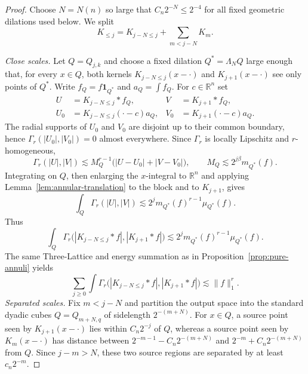 \documentclass[10pt,a4paper]{amsart}
\numberwithin{equation}{section}
\newcommand{\R}{\mathbb R}
\newcommand{\norm}[1]{\lVert #1\rVert}
\begin{document}
\begin{proof}
Choose $N=N(n)$ so large that $C_n2^{-N}\le2^{-4}$ for all fixed geometric
dilations used below.  We split
\[
 K_{\le j}=K_{j-N\le j}+\sum_{m<j-N}K_m.
\]

\emph{Close scales.}
Let $Q=Q_{j,k}$ and choose a fixed dilation $Q^*=\Lambda_NQ$ large enough
that, for every $x\in Q$, both kernels $K_{j-N\le j}(x-\cdot)$ and
$K_{j+1}(x-\cdot)$ see only points of $Q^*$.  Write
$f_Q=f\mathbf1_{Q^*}$ and $a_Q=\int f_Q$.  For $c\in\R^n$ set
\[
\begin{aligned}
 U&=K_{j-N\le j}*f_Q, & V&=K_{j+1}*f_Q,\\
 U_0&=K_{j-N\le j}(\cdot-c)a_Q,
 &V_0&=K_{j+1}(\cdot-c)a_Q.
\end{aligned}
\]
The radial supports of $U_0$ and $V_0$ are disjoint up to their common
boundary, hence $\Gamma_r(|U_0|,|V_0|)=0$ almost everywhere.  Since
$\Gamma_r$ is locally Lipschitz and $r$-homogeneous,
\[
 \Gamma_r(|U|,|V|)
 \lesssim M_Q^{r-1}\bigl(|U-U_0|+|V-V_0|\bigr),
 \qquad M_Q\lesssim 2^{j\beta}m_{Q^*}(f).
\]
Integrating on $Q$, then enlarging the $x$-integral to $\R^n$ and applying
Lemma~\ref{lem:annular-translation} to the block and to $K_{j+1}$, gives
\[
 \int_Q\Gamma_r(|U|,|V|)
 \lesssim 2^j m_{Q^*}(f)^{r-1}
 \mu_{Q^*}(f).
\]
Thus
\begin{equation}\label{eq:close-local}
 \int_Q\Gamma_r\bigl(|K_{j-N\le j}*f|,|K_{j+1}*f|\bigr)
 \lesssim2^j m_{Q^*}(f)^{r-1}\mu_{Q^*}(f).
\end{equation}
The same Three-Lattice and energy summation as in
Proposition~\ref{prop:pure-annuli} yields
\begin{equation}\label{eq:close-sum}
 \sum_{j\ge0}\int
 \Gamma_r\bigl(|K_{j-N\le j}*f|,|K_{j+1}*f|\bigr)
 \lesssim\norm f_1^r.
\end{equation}
\emph{Separated scales.}
Fix $m<j-N$ and partition the output space into the
standard dyadic cubes $Q=Q_{m+N,q}$ of sidelength $2^{-(m+N)}$.
For $x\in Q$, a source point seen by $K_{j+1}(x-\cdot)$ lies within
$C_n2^{-j}$ of $Q$, whereas a source point seen by $K_m(x-\cdot)$ has distance
between $2^{-m-1}-C_n2^{-(m+N)}$ and
$2^{-m}+C_n2^{-(m+N)}$ from $Q$.  Since $j-m>N$, these two source regions are
separated by at least $c_n2^{-m}$.


\end{proof}
\end{document}
